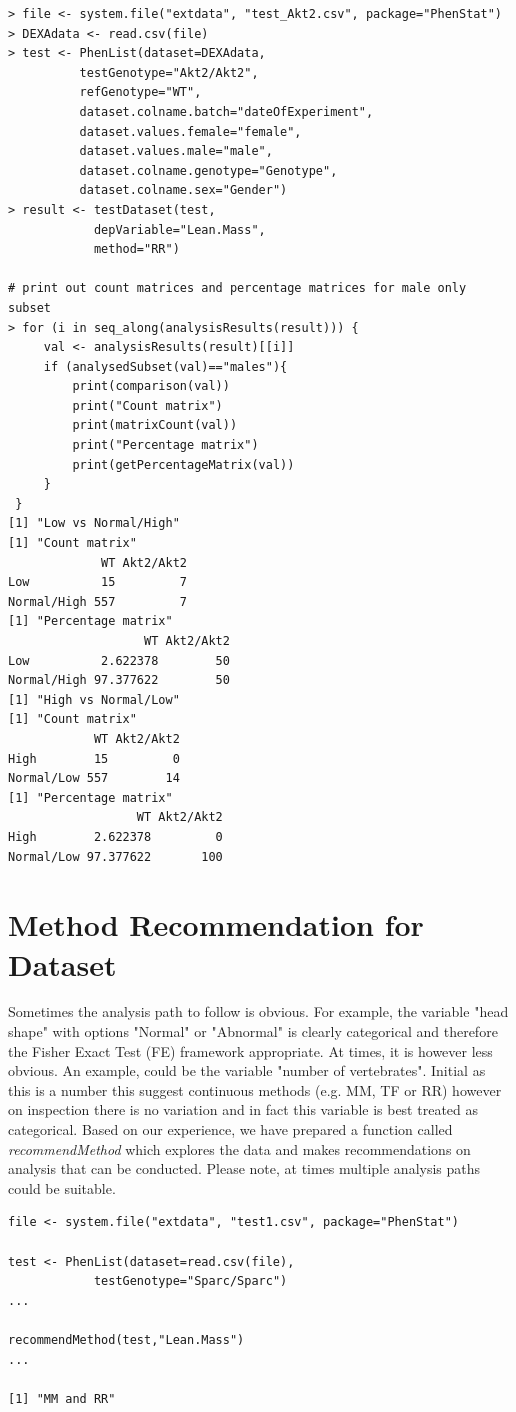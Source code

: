 \documentclass[12pt,a4paper]{article}
\begin{document}
\begingroup
    \fontsize{8pt}{12pt}\selectfont
\begin{verbatim}
> file <- system.file("extdata", "test_Akt2.csv", package="PhenStat") 
> DEXAdata <- read.csv(file)
> test <- PhenList(dataset=DEXAdata,
		  testGenotype="Akt2/Akt2",
		  refGenotype="WT",
		  dataset.colname.batch="dateOfExperiment",
		  dataset.values.female="female",
		  dataset.values.male="male", 
		  dataset.colname.genotype="Genotype", 
		  dataset.colname.sex="Gender")
> result <- testDataset(test, 
			depVariable="Lean.Mass", 
			method="RR")
			
# print out count matrices and percentage matrices for male only subset			
> for (i in seq_along(analysisResults(result))) {
     val <- analysisResults(result)[[i]]
     if (analysedSubset(val)=="males"){
     	 print(comparison(val))
     	 print("Count matrix")
         print(matrixCount(val))   
         print("Percentage matrix")
         print(getPercentageMatrix(val))     
     }
 }
[1] "Low vs Normal/High"
[1] "Count matrix"
             WT Akt2/Akt2
Low          15         7
Normal/High 557         7
[1] "Percentage matrix"
                   WT Akt2/Akt2
Low          2.622378        50
Normal/High 97.377622        50
[1] "High vs Normal/Low"
[1] "Count matrix"
            WT Akt2/Akt2
High        15         0
Normal/Low 557        14
[1] "Percentage matrix"
                  WT Akt2/Akt2
High        2.622378         0
Normal/Low 97.377622       100
\end{verbatim}
\endgroup 
\section{Method Recommendation for Dataset}
\label{section:Recommendation}

Sometimes the analysis path to follow is obvious. For example, the variable "head shape" with options "Normal" or "Abnormal" is clearly categorical and therefore the Fisher Exact Test (FE) framework appropriate. At times, it is however less obvious. An example, could be the variable "number of vertebrates". Initial as this is a number this suggest continuous methods (e.g. MM, TF or RR)  however on inspection there is no variation and in fact this variable is best treated as categorical. Based on our experience, we have prepared a function called \textit{recommendMethod} which explores the data and makes recommendations on analysis that can be conducted. Please note, at times multiple analysis paths could be suitable. 


\begingroup
\fontsize{8pt}{12pt}\selectfont
\begin{verbatim}
file <- system.file("extdata", "test1.csv", package="PhenStat")

test <- PhenList(dataset=read.csv(file),
            testGenotype="Sparc/Sparc")
...

recommendMethod(test,"Lean.Mass")
...

[1] "MM and RR"
\end{verbatim}
\endgroup
\end{document}
